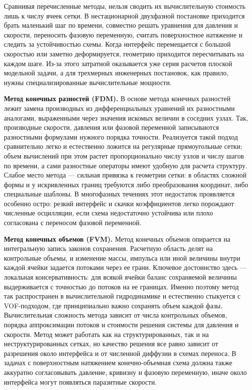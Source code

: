 Сравнивая перечисленные методы, нельзя сводить их вычислительную стоимость
лишь к числу ячеек сетки. В нестационарной двухфазной постановке приходится
брать маленький шаг по времени, совместно решать уравнения для давления и
скорости, переносить фазовую переменную, считать поверхностное натяжение и
следить за устойчивостью схемы. Когда интерфейс перемещается с большой
скоростью или заметно деформируется, геометрию приходится пересчитывать на
каждом шаге. Из-за этого затратной оказывается уже серия расчетов плоской
модельной задачи, а для трехмерных инженерных постановок, как правило, нужны
специализированные вычислительные мощности.

\textbf{Метод конечных разностей (FDM).}
В основе метода конечных разностей лежит замена производных из
дифференциальных уравнений их разностными аналогами, выраженными через
значения искомых величин в соседних узлах. Так, производные скорости, давления
или фазовой переменной записываются разностными формулами нужного порядка
точности. Реализуется такой подход сравнительно легко и естественно ложится на
регулярные прямоугольные сетки; объем вычислений при этом растет
пропорционально числу узлов и числу шагов по времени, а сами разностные
операторы имеют удобную для расчета структуру. Слабое место метода --- сильная
привязка к геометрии сетки: в областях сложной формы и у искривленных границ
требуются либо преобразования координат, либо специальные шаблоны. В
многофазных течениях этот недостаток проявляется особенно остро: резкий
интерфейс и скачки коэффициентов легко порождают численные осцилляции, если
схема недостаточно устойчива или плохо согласована с переносом фазовой
переменной.

\textbf{Метод конечных объемов (FVM).}
Метод конечных объемов опирается на интегральную запись законов сохранения.
Расчетную область делят на контрольные объемы, и изменение массы, импульса или
иной величины внутри каждой ячейки задается потоками через ее грани. Ключевое
достоинство здесь --- локальная консервативность: для всякой ячейки баланс
сохраняемой величины выдерживается с точностью до потоков на ее границах.
Именно поэтому метод так распространен в вычислительной гидродинамике и
естественно стыкуется с VOF-подходом, где принципиально важно сохранять объем
каждой фазы. Вычислительная сложность метода зависит
от числа контрольных объемов, порядка аппроксимации потоков и стоимости решения
системы для давления и скорости. Метод может работать как на структурированных,
так и на неструктурированных сетках, но качество решения все равно зависит от
разрешения около интерфейса и от численной диффузии в схемах переноса. В
задачах с поверхностным натяжением конечно-объемная схема должна также
аккуратно согласовывать давление, кривизну и фазовую переменную, иначе около
интерфейса могут появляться паразитные скорости.

